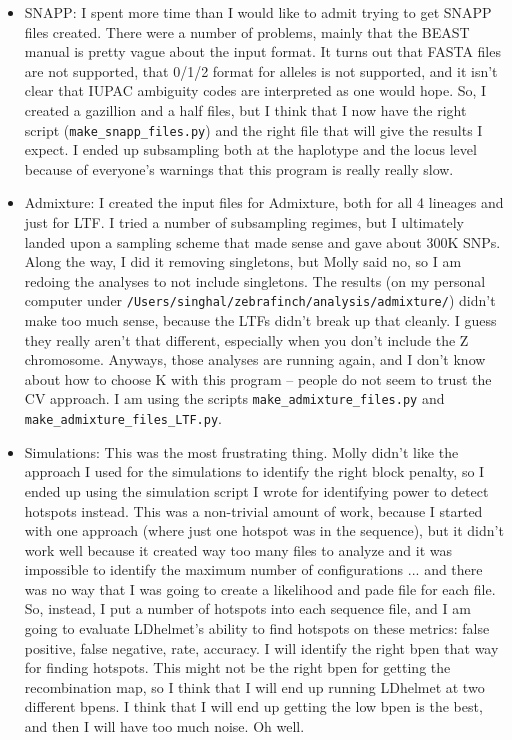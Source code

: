 \documentclass[idxtotoc,hyperref,openany,oneside]{labbook} %
\begin{document}
\begin{itemize}
\item SNAPP: I spent more time than I would like to admit trying to get SNAPP files created. There were a number of problems, mainly that the BEAST manual is pretty vague about the input format. It turns out that FASTA files are not supported, that 0/1/2 format for alleles is not supported, and it isn't clear that IUPAC ambiguity codes are interpreted as one would hope. So, I created a gazillion and a half files, but I think that I now have the right script (\verb+make_snapp_files.py+) and the right file that will give the results I expect. I ended up subsampling both at the haplotype and the locus level because of everyone's warnings that this program is really really slow.
\item Admixture: I created the input files for Admixture, both for all 4 lineages and just for LTF. I tried a number of subsampling regimes, but I ultimately landed upon a sampling scheme that made sense and gave about 300K SNPs. Along the way, I did it removing singletons, but Molly said no, so I am redoing the analyses to not include singletons. The results (on my personal computer under \verb+/Users/singhal/zebrafinch/analysis/admixture/+) didn't make too much sense, because the LTFs didn't break up that cleanly. I guess they really aren't that different, especially when you don't include the Z chromosome. Anyways, those analyses are running again, and I don't know about how to choose K with this program -- people do not seem to trust the CV approach. I am using the scripts \verb+make_admixture_files.py+ and \verb+make_admixture_files_LTF.py+.
\item Simulations: This was the most frustrating thing. Molly didn't like the approach I used for the simulations to identify the right block penalty, so I ended up using the simulation script I wrote for identifying power to detect hotspots instead. This was a non-trivial amount of work, because I started with one approach (where just one hotspot was in the sequence), but it didn't work well because it created way too many files to analyze and it was impossible to identify the maximum number of configurations ... and there was no way that I was going to create a likelihood and pade file for each file. So, instead, I put a number of hotspots into each sequence file, and I am going to evaluate LDhelmet's ability to find hotspots on these metrics: false positive, false negative, rate, accuracy. I will identify the right bpen that way for finding hotspots. This might not be the right bpen for getting the recombination map, so I think that I will end up running LDhelmet at two different bpens. I think that I will end up getting the low bpen is the best, and then I will have too much noise. Oh well.

\end{itemize}
\end{document}

